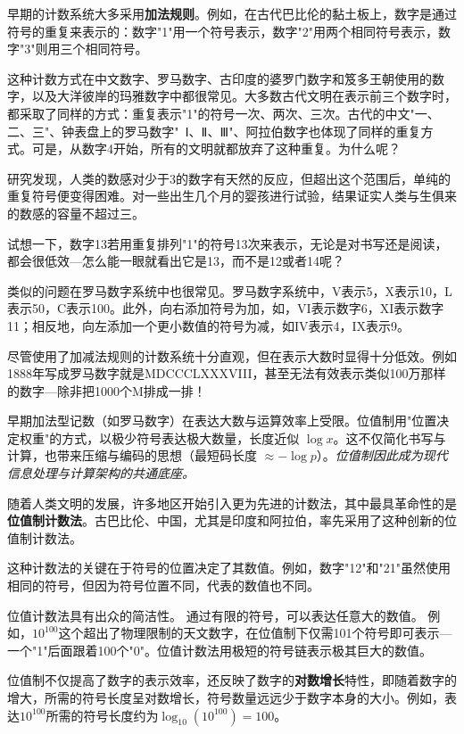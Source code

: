 早期的计数系统大多采用{\bf 加法规则}。例如，在古代巴比伦的黏土板上，数字是通过符号的重复来表示的：数字"1"用一个符号表示，数字"2"用两个相同符号表示，数字"3"则用三个相同符号。

这种计数方式在中文数字、罗马数字、古印度的婆罗门数字和笈多王朝使用的数字，以及大洋彼岸的玛雅数字中都很常见。大多数古代文明在表示前三个数字时，都采取了同样的方式：重复表示"1"的符号一次、两次、三次。古代的中文"一、二、三"、钟表盘上的罗马数字"~Ⅰ、Ⅱ、Ⅲ"、阿拉伯数字也体现了同样的重复方式。可是，从数字4开始，所有的文明就都放弃了这种重复。为什么呢？

研究发现，人类的数感对少于3的数字有天然的反应，但超出这个范围后，单纯的重复符号便变得困难。对一些出生几个月的婴孩进行试验，结果证实人类与生俱来的数感的容量不超过三。

试想一下，数字13若用重复排列"1"的符号13次来表示，无论是对书写还是阅读，都会很低效---怎么能一眼就看出它是13，而不是12或者14呢？

类似的问题在罗马数字系统中也很常见。罗马数字系统中，V表示5，X表示10，L表示50，C表示100。此外，向右添加符号为加，如，VI表示数字6，XI表示数字11；相反地，向左添加一个更小数值的符号为减，如IV表示4，IX表示9。

尽管使用了加减法规则的计数系统十分直观，但在表示大数时显得十分低效。例如1888年写成罗马数字就是MDCCCLXXXVIII，甚至无法有效表示类似100万那样的数字---除非把1000个M排成一排！


早期加法型记数（如罗马数字）在表达大数与运算效率上受限。位值制用"位置决定权重"的方式，以极少符号表达极大数量，长度近似 $\log x$。这不仅简化书写与计算，也带来压缩与编码的思想（最短码长度 $\approx-\log p$）。\emph{位值制因此成为现代信息处理与计算架构的共通底座。}

随着人类文明的发展，许多地区开始引入更为先进的计数法，其中最具革命性的是{\bf 位值制计数法}。古巴比伦、中国，尤其是印度和阿拉伯，率先采用了这种创新的位值制计数法。

这种计数法的关键在于符号的位置决定了其数值。例如，数字"12"和"21"虽然使用相同的符号，但因为符号位置不同，代表的数值也不同。

位值计数法具有出众的简洁性。
通过有限的符号，可以表达任意大的数值。
例如，$10^{100}$这个超出了物理限制的天文数字，在位值制下仅需101个符号即可表示---一个"1"后面跟着100个"0"。位值计数法用极短的符号链表示极其巨大的数值。

位值制不仅提高了数字的表示效率，还反映了数字的{\bf 对数增长}特性，即随着数字的增大，所需的符号长度呈对数增长，符号数量远远少于数字本身的大小。例如，表达$10^{100}$所需的符号长度约为$\log_{10}(10^{100})=100$。

